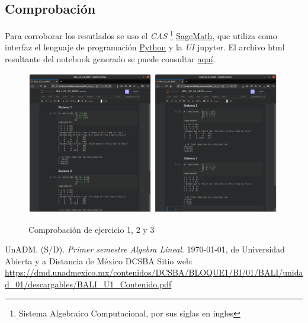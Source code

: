 \documentclass[11pt]{article}
\begin{document}
	\subsection*{Comprobaci\'on}
	\par Para corroborar los resutlados se uso el \textit{CAS} 
\footnote{Sistema Algebraico Computacional, por sus siglas en ingles} 
	\href{https://www.sagemath.org/}{SageMath}, que utiliza como interfaz el lenguaje de programaci\'on \href{https://www.python.org/}{Python} y la \textit{UI} jupyter. El archivo html resultante del notebook generado se puede consultar \href{https://github.com/BenchHPZ/UnADM-Biotecnologia/blob/master/B1-1/AL/Actividades/BALI_U2_A3_BERC.ipynb}{aqu\'i}.
	
	\begin{figure}[h]
		\centering
		\includegraphics[width=0.49\textwidth]{BALI-U2-A3-1.png}
		\includegraphics[width=0.49\textwidth]{BALI-U2-A3-2.png}
		\caption{Comprobaci\'on de ejercicio 1, 2 y 3}
	\end{figure}



\newpage
\begin{thebibliography}{X}
	 UnADM. (S/D). \emph{Primer semestre Algebra Lineal}. \today, de Universidad Abierta y a Distancia de México \textbar{} DCSBA Sitio web: \url{https://dmd.unadmexico.mx/contenidos/DCSBA/BLOQUE1/BI/01/BALI/unidad_01/descargables/BALI_U1_Contenido.pdf}
\end{thebibliography}
\end{document}
